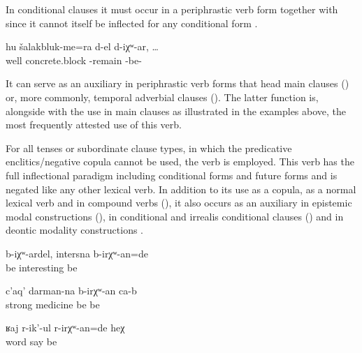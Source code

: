 In conditional clauses it must occur in a periphrastic verb form together with  since it cannot itself be inflected for any conditional form .
%
\begin{exe}
	\ex	\label{ex:If the concrete blocks remained (are left over)}
	\gll	hu		šalakbluk-me=ra	d-el	d-iχʷ-ar,	\ldots\\
		well		concrete.block	-remain\tsc{.pfv}	-be-\\
	\glt	{}
\end{exe}

It can serve as an auxiliary in periphrastic verb forms that head main clauses () or, more commonly, temporal adverbial clauses (). The latter function is, alongside with the use in main clauses as illustrated in the examples above, the most frequently attested use of this verb.

For all tenses or subordinate clause types, in which the predicative enclitics\slash negative copula cannot be used, the verb   is employed. This verb has the full inflectional paradigm including conditional forms  and future forms  and is negated like any other lexical verb. In addition to its use as a copula, as a normal lexical verb and in compound verbs (), it also occurs as an auxiliary in epistemic modal constructions (), in conditional and irrealis conditional clauses () and in deontic modality constructions .
%
\begin{exe}
	\ex	\label{ex:If it would be like this, it would be interesting}
	\gll	b-iχʷ-ardel,	intersna	b-irχʷ-an=de\\
		be	interesting	be\\
	\glt	{}

	\ex	\label{ex:It will be a strong medicine}
	\gll	c'aq'	darman-na	b-irχʷ-an	ca-b\\
		strong	medicine be	be\\
	\glt	{}

	\ex	\label{ex:She must have been quarreling}
	\gll	ʁaj	r-ik'-ul	r-irχʷ-an=de 	heχ\\
		word	say 	be 	\\
	\glt	{}
\end{exe}

